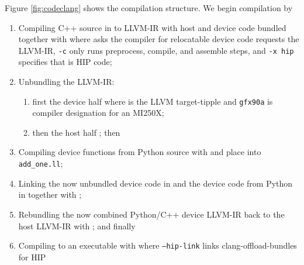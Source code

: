 Figure \ref{fig:codeclang} shows the compilation structure.
We begin compilation by
\begin{enumerate}
    \item Compiling C++ source in  to LLVM-IR with host and device code bundled together with  where  asks the compiler for relocatable device code  requests the LLVM-IR, \texttt{-c} only runs preprocess, compile, and assemble steps, and \texttt{-x hip} specifies that  is HIP code;
    
    \item Unbundling the LLVM-IR:
    
    \begin{enumerate}
        \item first the device half  where  is the LLVM target-tipple and \texttt{gfx90a} is compiler designation for an MI250X;
        
        \item then the host half ; then
    \end{enumerate}
    
    \item Compiling device functions from Python source with  and place into \texttt{add\_one.ll};
    
    \item Linking the now unbundled device code in  and the device code from Python in  together with ;
    
    \item Rebundling the now combined Python/C++ device LLVM-IR back to the host LLVM-IR with ; and finally
    
    \item Compiling to an executable with  where \texttt{--hip-link} links clang-offload-bundles for HIP
    
\end{enumerate}

